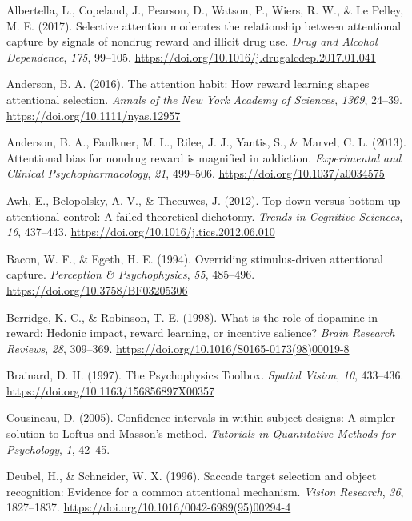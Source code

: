 \documentclass[man, a4paper, noextraspace, 11pt,floatsintext]{apa6}
\theoremstyle{definition}
\theoremstyle{definition}
\theoremstyle{definition}
\theoremstyle{remark}
\begin{document}
\hypertarget{refs}{}
\hypertarget{ref-Albertella2017a}{}
Albertella, L., Copeland, J., Pearson, D., Watson, P., Wiers, R. W., \&
Le Pelley, M. E. (2017). Selective attention moderates the relationship
between attentional capture by signals of nondrug reward and illicit
drug use. \emph{Drug and Alcohol Dependence}, \emph{175}, 99--105.
\url{https://doi.org/10.1016/j.drugalcdep.2017.01.041}

\hypertarget{ref-Anderson2015a}{}
Anderson, B. A. (2016). The attention habit: How reward learning shapes
attentional selection. \emph{Annals of the New York Academy of
Sciences}, \emph{1369}, 24--39. \url{https://doi.org/10.1111/nyas.12957}

\hypertarget{ref-Anderson2013}{}
Anderson, B. A., Faulkner, M. L., Rilee, J. J., Yantis, S., \& Marvel,
C. L. (2013). Attentional bias for nondrug reward is magnified in
addiction. \emph{Experimental and Clinical Psychopharmacology},
\emph{21}, 499--506. \url{https://doi.org/10.1037/a0034575}

\hypertarget{ref-Awh2012}{}
Awh, E., Belopolsky, A. V., \& Theeuwes, J. (2012). Top-down versus
bottom-up attentional control: A failed theoretical dichotomy.
\emph{Trends in Cognitive Sciences}, \emph{16}, 437--443.
\url{https://doi.org/10.1016/j.tics.2012.06.010}

\hypertarget{ref-Bacon1994}{}
Bacon, W. F., \& Egeth, H. E. (1994). Overriding stimulus-driven
attentional capture. \emph{Perception \& Psychophysics}, \emph{55},
485--496. \url{https://doi.org/10.3758/BF03205306}

\hypertarget{ref-Berridge1998}{}
Berridge, K. C., \& Robinson, T. E. (1998). What is the role of dopamine
in reward: Hedonic impact, reward learning, or incentive salience?
\emph{Brain Research Reviews}, \emph{28}, 309--369.
\url{https://doi.org/10.1016/S0165-0173(98)00019-8}

\hypertarget{ref-Brainard1997}{}
Brainard, D. H. (1997). The Psychophysics Toolbox. \emph{Spatial
Vision}, \emph{10}, 433--436.
\url{https://doi.org/10.1163/156856897X00357}

\hypertarget{ref-Cousineau2005}{}
Cousineau, D. (2005). Confidence intervals in within-subject designs: A
simpler solution to Loftus and Masson's method. \emph{Tutorials in
Quantitative Methods for Psychology}, \emph{1}, 42--45.

\hypertarget{ref-Deubel1996}{}
Deubel, H., \& Schneider, W. X. (1996). Saccade target selection and
object recognition: Evidence for a common attentional mechanism.
\emph{Vision Research}, \emph{36}, 1827--1837.
\url{https://doi.org/10.1016/0042-6989(95)00294-4}
\end{document}

